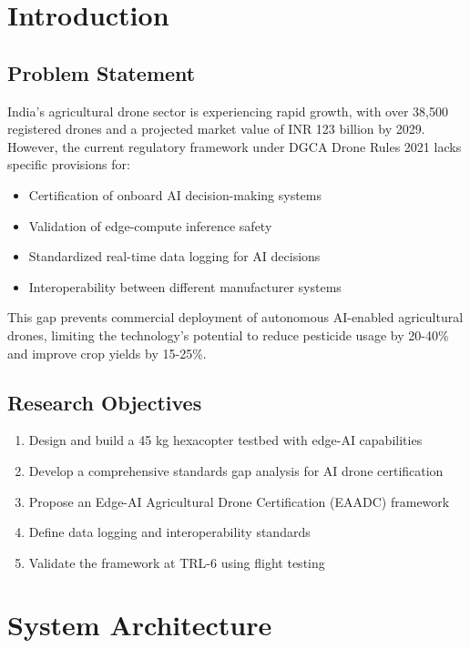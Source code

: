\documentclass[12pt,a4paper]{article}
\begin{document}
\section{Introduction}

\subsection{Problem Statement}
India's agricultural drone sector is experiencing rapid growth, with over 38,500 registered drones and a projected market value of INR 123 billion by 2029. However, the current regulatory framework under DGCA Drone Rules 2021 lacks specific provisions for:

\begin{itemize}
    \item Certification of onboard AI decision-making systems
    \item Validation of edge-compute inference safety
    \item Standardized real-time data logging for AI decisions
    \item Interoperability between different manufacturer systems
\end{itemize}

This gap prevents commercial deployment of autonomous AI-enabled agricultural drones, limiting the technology's potential to reduce pesticide usage by 20-40\% and improve crop yields by 15-25\%.

\subsection{Research Objectives}
\begin{enumerate}
    \item Design and build a 45 kg hexacopter testbed with edge-AI capabilities
    \item Develop a comprehensive standards gap analysis for AI drone certification
    \item Propose an Edge-AI Agricultural Drone Certification (EAADC) framework
    \item Define data logging and interoperability standards
    \item Validate the framework at TRL-6 using flight testing
\end{enumerate}

\section{System Architecture}
\end{document}
